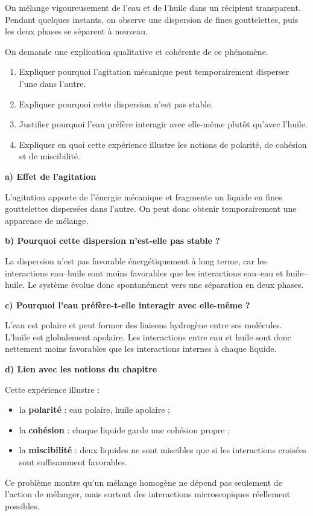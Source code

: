 \documentclass[11pt,a4paper]{article}
\begin{document}
\begin{enoncebox}
On mélange vigoureusement de l'eau et de l'huile dans un récipient transparent.  
Pendant quelques instants, on observe une dispersion de fines gouttelettes, puis les deux phases se séparent à nouveau.

On demande une explication qualitative et cohérente de ce phénomène.

\begin{enumerate}[label=\arabic*)]
    \item Expliquer pourquoi l'agitation mécanique peut temporairement disperser l'une dans l'autre.
    \item Expliquer pourquoi cette dispersion n'est pas stable.
    \item Justifier pourquoi l'eau préfère interagir avec elle-même plutôt qu'avec l'huile.
    \item Expliquer en quoi cette expérience illustre les notions de polarité, de cohésion et de miscibilité.
\end{enumerate}
\end{enoncebox}

\begin{corrigebox}
\textbf{a) Effet de l'agitation}

L'agitation apporte de l'énergie mécanique et fragmente un liquide en fines gouttelettes dispersées dans l'autre.  
On peut donc obtenir temporairement une apparence de mélange.

\textbf{b) Pourquoi cette dispersion n'est-elle pas stable ?}

La dispersion n'est pas favorable énergétiquement à long terme, car les interactions eau--huile sont moins favorables que les interactions eau--eau et huile--huile.  
Le système évolue donc spontanément vers une séparation en deux phases.

\textbf{c) Pourquoi l'eau préfère-t-elle interagir avec elle-même ?}

L'eau est polaire et peut former des liaisons hydrogène entre ses molécules.  
L'huile est globalement apolaire.  
Les interactions entre eau et huile sont donc nettement moins favorables que les interactions internes à chaque liquide.

\textbf{d) Lien avec les notions du chapitre}

Cette expérience illustre :
\begin{itemize}
    \item la \textbf{polarité} : eau polaire, huile apolaire ;
    \item la \textbf{cohésion} : chaque liquide garde une cohésion propre ;
    \item la \textbf{miscibilité} : deux liquides ne sont miscibles que si les interactions croisées sont suffisamment favorables.
\end{itemize}

\begin{bilanbox}
Ce problème montre qu'un mélange homogène ne dépend pas seulement de l'action de mélanger, mais surtout des interactions microscopiques réellement possibles.
\end{bilanbox}
\end{corrigebox}
\end{document}
